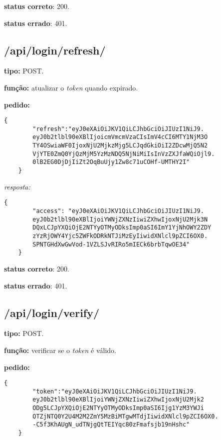 \documentclass[11pt,a4paper]{report}
\begin{document}
\textbf{status correto}: 200.

\textbf{status errado}: 401.

\newpage

\subsection{/api/login/refresh/}

\textbf{tipo:} POST.

\textbf{função:} atualizar o \emph{token} quando expirado.

\textbf{pedido:}

\begin{lstlisting}[style = code]
    {
        "refresh":"eyJ0eXAiOiJKV1QiLCJhbGciOiJIUzI1NiJ9.
        eyJ0b2tlbl90eXBlIjoicmVmcmVzaCIsImV4cCI6MTY1NjM3O
        TY4OSwiaWF0IjoxNjU2MjkzMjg5LCJqdGkiOiI2ZDcwMjQ5N2
        VjYTE0ZmQ0YjQzMjM5YzMzNDQ5NjNiMiIsInVzZXJfaWQiOjl9.
        0lB2EG0DjDjIiZt2OqBuUjy1Zw8c71uCOHf-UMTHY2I"  
    }
\end{lstlisting}

\emph{resposta:}

\begin{lstlisting}[style = code]
    {
        "access": "eyJ0eXAiOiJKV1QiLCJhbGciOiJIUzI1NiJ9.
        eyJ0b2tlbl90eXBlIjoiYWNjZXNzIiwiZXhwIjoxNjU2Mjk3N
        DQxLCJpYXQiOjE2NTYyOTMyODksImp0aSI6ImY1YjNhOWY2ZDY
        zYzRjOWY4Yjc5ZWFkODRkNTJiMzEyIiwidXNlcl9pZCI6OX0.
        SPNTGHdXwGwVod-1VZLSJvRIRo5mIECk6brbTqwOE34"
    }
\end{lstlisting}

\textbf{status correto}: 200.

\textbf{status errado}: 401.

\subsection{/api/login/verify/}

\textbf{tipo:} POST.

\textbf{função:} verificar se o \emph{token} é válido.

\textbf{pedido:}

\begin{lstlisting}[style = code]
    {
        "token":"eyJ0eXAiOiJKV1QiLCJhbGciOiJIUzI1NiJ9.
        eyJ0b2tlbl90eXBlIjoiYWNjZXNzIiwiZXhwIjoxNjU2Mjk2
        ODg5LCJpYXQiOjE2NTYyOTMyODksImp0aSI6Ijg1YzM3YWJi
        OTZjNTQ0Y2U4M2M2ZmY5MzBiMTgwMTdjIiwidXNlcl9pZCI6OX0.
        -C5f3KhAUgN_udTNjgQtTEIYqc80zFmafsjb19nHshc" 
    }
\end{lstlisting}
\end{document}
